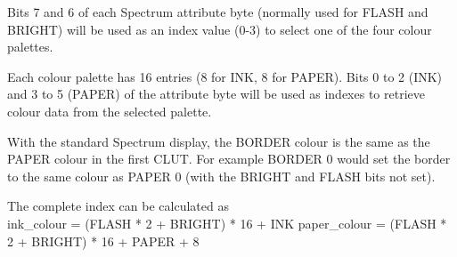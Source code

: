 Bits 7 and 6 of each Spectrum attribute byte (normally used for FLASH
and BRIGHT) will be used as an index value (0-3) to select one of the
four colour palettes.

Each colour palette has 16 entries (8 for INK, 8 for PAPER). Bits 0 to
2 (INK) and 3 to 5 (PAPER) of the attribute byte will be used as
indexes to retrieve colour data from the selected palette.

With the standard Spectrum display, the BORDER colour is the same as
the PAPER colour in the first CLUT. For example BORDER 0 would set the
border to the same colour as PAPER 0 (with the BRIGHT and FLASH bits
not set).

The complete index can be calculated as\\
ink\_colour = (FLASH * 2 + BRIGHT) * 16 + INK
paper\_colour = (FLASH * 2 + BRIGHT) * 16 + PAPER + 8


